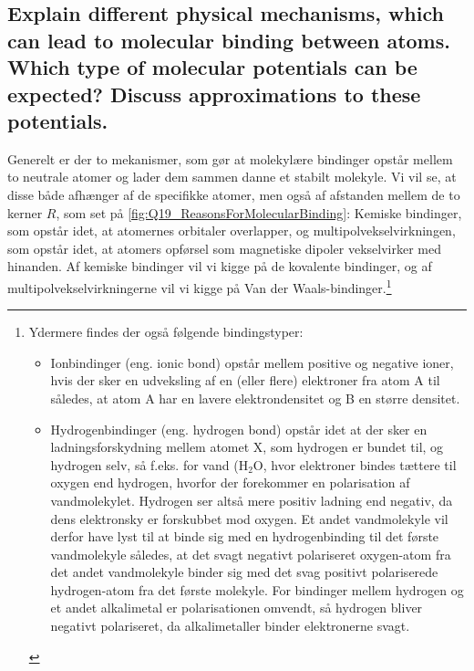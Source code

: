 \subsection{Explain different physical mechanisms, which can lead to molecular binding between atoms. Which type of molecular potentials can be expected? Discuss approximations to these potentials.}


Generelt er der to mekanismer, som gør at molekylære bindinger opstår mellem to neutrale atomer og lader dem sammen danne et stabilt molekyle. Vi vil se, at disse både afhænger af de specifikke atomer, men også af afstanden mellem de to kerner $R$, som set på \cref{fig:Q19_ReasonsForMolecularBinding}: Kemiske bindinger, som opstår idet, at atomernes orbitaler overlapper, og multipolvekselvirkningen, som opstår idet, at atomers opførsel som magnetiske dipoler vekselvirker med hinanden. Af kemiske bindinger vil vi kigge på de \textsf{kovalente bindinger}, og af multipolvekselvirkningerne vil vi kigge på \textsf{Van der Waals-bindinger}.\footnote{
    Ydermere findes der også følgende bindingstyper:
    \begin{itemize}
        \item \textsf{Ionbindinger} (eng. ionic bond) opstår mellem positive og negative ioner, hvis der sker en udveksling af en (eller flere) elektroner fra atom A til  således, at atom A har en lavere elektrondensitet og B en større densitet.
        \item \textsf{Hydrogenbindinger} (eng. hydrogen bond) opstår idet at der sker en ladningsforskydning mellem atomet X, som hydrogen er bundet til, og hydrogen selv, så f.eks. for vand ($\text{H}_2\text{O}$, hvor elektroner bindes tættere til oxygen end hydrogen, hvorfor der forekommer en polarisation af vandmolekylet. Hydrogen ser altså mere positiv ladning end negativ, da dens elektronsky er forskubbet mod oxygen. Et andet vandmolekyle vil derfor have lyst til at binde sig med en hydrogenbinding til det første vandmolekyle således, at det svagt negativt polariseret oxygen-atom fra det andet vandmolekyle binder sig med det svag positivt polariserede hydrogen-atom fra det første molekyle. For bindinger mellem hydrogen og et andet alkalimetal er polarisationen omvendt, så hydrogen bliver negativt polariseret, da alkalimetaller binder elektronerne svagt.
    \end{itemize}
}

